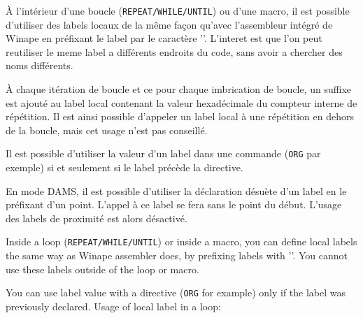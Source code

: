 
\subsubsection{}\label{LOCALLABELS}

\begin{xfr}
  À l'intérieur d'une boucle (\texttt{REPEAT/WHILE/UNTIL}) ou d'une macro, il est possible d'utiliser des labels locaux de la même façon qu'avec l'assembleur intégré de Winape en préfixant le label par le caractère '\at'. L'interet est que l'on peut reutiliser le meme label a différents endroits du code, sans avoir a chercher des noms différents.

  À chaque itération de boucle et ce pour chaque imbrication de boucle, un suffixe est ajouté au label local contenant la valeur hexadécimale du compteur interne de répétition. Il est ainsi possible d'appeler un label local à une répétition en dehors de la boucle, mais cet usage n'est pas conseillé.

  Il est possible d'utiliser la valeur d'un label dans une commande (\texttt{ORG} par exemple) si et seulement si le label précède la directive.

  En mode DAMS, il est possible d'utiliser la déclaration désuète d'un label en le préfixant d'un point. L'appel à ce label se fera sans le point du début. L'usage des labels de proximité est alors désactivé.

\end{xfr}

\begin{xen}
Inside a loop (\texttt{REPEAT/WHILE/UNTIL}) or inside a macro, you can define local labels the same way as Winape assembler does, by prefixing labels with '\at'.
You cannot use these labels outside of the loop or macro.


You can use label value with a directive (\texttt{ORG} for example) only if the label was previously declared.
Usage of local label in a loop:


\end{xen}

